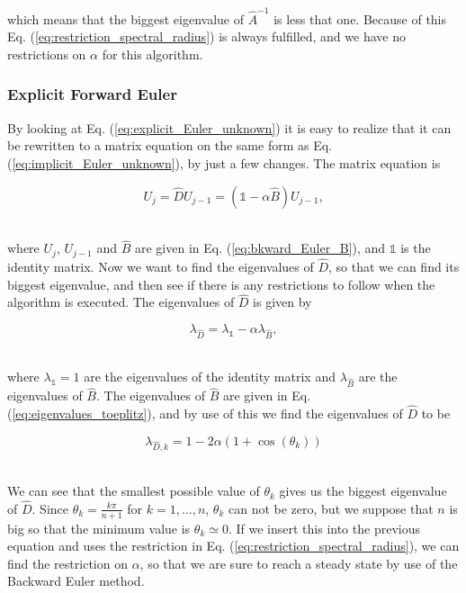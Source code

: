\documentclass[12pt]{article}
\begin{document}
\begin{flushleft}
which means that the biggest eigenvalue of $\hat{A}^{-1}$ is less that one. Because of this Eq. (\ref{eq:restriction_spectral_radius}) is always fulfilled, and we have no restrictions on $\alpha$ for this algorithm.

\subsubsection{Explicit Forward Euler\label{sect:eigvals_forwrd_Euler}}
By looking at Eq. (\ref{eq:explicit_Euler_unknown}) it is easy to realize that it can be rewritten to a matrix equation on the same form as Eq. (\ref{eq:implicit_Euler_unknown}), by just a few changes. The matrix equation is

\vspace{5mm}
$$U_{j} = \hat{D}U_{j-1} = (\mathbb{1} - \alpha\hat{B})U_{j-1},$$\\ 
\vspace{5mm}

where $U_{j}$, $U_{j-1}$ and $\hat{B}$ are given in Eq. (\ref{eq:bkward_Euler_B}), and $\mathbb{1}$ is the identity matrix. Now we want to find the eigenvalues of $\hat{D}$, so that we can find its biggest eigenvalue, and then see if there is any restrictions to follow when the algorithm is executed. The eigenvalues of $\hat{D}$ is given by

\vspace{5mm}
$$\lambda_{\hat{D}} = \lambda_{\mathbb{1}} - \alpha\lambda_{\hat{B}},$$\\
\vspace{5mm}

where $\lambda_{\mathbb{1}} = 1$ are the eigenvalues of the identity matrix and $\lambda_{\hat{B}}$ are the eigenvalues of $\hat{B}$. The eigenvalues of $\hat{B}$ are given in Eq. (\ref{eq:eigenvalues_toeplitz}), and by use of this we find the eigenvalues of $\hat{D}$ to be

\vspace{5mm}
$$\lambda_{\hat{D},k} = 1-2\alpha(1+\cos(\theta_k))$$\\
\vspace{5mm}

We can see that the smallest possible value of $\theta_k$ gives us the biggest eigenvalue of $\hat{D}$. Since $\theta_k = \frac{k\pi}{n+1}$ for $k=1,\dots ,n$, $\theta_k$ can not be zero, but we suppose that $n$ is big so that the minimum value is $\theta_k \simeq 0$. If we insert this into the previous equation and uses the restriction in Eq. (\ref{eq:restriction_spectral_radius}), we can find the restriction on $\alpha$, so that we are sure to reach a steady state by use of the Backward Euler method.


\end{flushleft}
\end{document}
